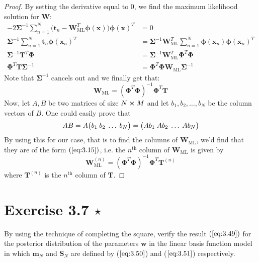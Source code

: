 \begin{proof}
    By setting the derivative equal to 0, we find the maximum likelihood
    solution for $\mathbf{W}$:
    \begin{align*}
            -2\mathbf{\Sigma}^{-1} \sum_{n=1}^{N} \big(\mathbf{t}_n 
            - \mathbf{W}_{\text{ML}}^T\bm{\phi}(\mathbf{x})\big) \bm{\phi}(\mathbf{x})^T 
        &= 0 \\
            \mathbf{\Sigma}^{-1} \sum_{n=1}^{N} \mathbf{t}_n \bm{\phi}(\mathbf{x}_n)^T
        &= \mathbf{\Sigma}^{-1} \mathbf{W}_{\text{ML}}^T 
            \sum_{n=1}^{N} \bm{\phi}(\mathbf{x}_n)\bm{\phi}(\mathbf{x}_n)^T \\
            \mathbf{\Sigma}^{-1} \mathbf{T}^T \mathbf{\Phi} 
        &= \mathbf{\Sigma}^{-1} \mathbf{W}_{\text{ML}}^T \mathbf{\Phi}^T\mathbf{\Phi} \\
            \mathbf{\Phi}^T\mathbf{T}\mathbf{\Sigma}^{-1}
        &= \mathbf{\Phi}^T\mathbf{\Phi}\mathbf{W}_{\text{ML}}\mathbf{\Sigma}^{-1}
    \end{align*}
    Note that $\mathbf{\Sigma}^{-1}$ cancels out and we finally get that:
     \[
         \mathbf{W}_{\text{ML}} = (\mathbf{\Phi}^T\mathbf{\Phi})^{-1} \mathbf{\Phi}^T\mathbf{T}
    \] 
    Now, let $A, B$ be two matrices of size $N \cross M$ and let $b_1, b_2, \ldots, b_N$ 
    be the column vectors of $B$. One could easily prove that
     \[
         AB = A \big(b_1 \hspace{0.25em} b_2 \hspace{0.25em} \ldots \hspace{0.25em} b_N\big)
         = \big(Ab_1 \hspace{0.25em} Ab_2 \hspace{0.25em} \ldots \hspace{0.25em} Ab_N\big)
    \] 
    By using this for our case, that is to find the columns of $\mathbf{W}_{\text{ML}}$,
    we'd find that they are of the form $(\ref{eq:3.15})$, i.e. the $n^{\text{th}}$
    column of $\mathbf{W}_{\text{ML}}$ is given by
    \[
        \mathbf{W}_{\text{ML}}^{(n)} =
        (\mathbf{\Phi}^T\mathbf{\Phi})^{-1} \mathbf{\Phi}^T\mathbf{T}^{(n)}
    \] 
    where $\mathbf{T}^{(n)}$ is the $n^{\text{th}}$ column of $\mathbf{T}$.
\end{proof}

\section*{Exercise 3.7 $\star$}
By using the technique of completing the square, verify the result $(\ref{eq:3.49})$ for
the posterior distribution of the parameters $\mathbf{w}$ in the linear basis function
model in which $\mathbf{m}_N$ and $\mathbf{S}_N$ are defined by ($\ref{eq:3.50}$) and ($\ref{eq:3.51}$) respectively.

